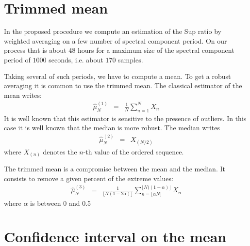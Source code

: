 
\section{Trimmed mean}
In the proposed procedure we compute an estimation of the Sup ratio by weighted averaging on a few number of spectral component period. On our process that is about $48$ hours for a maximum size of the spectral component period of $1000$ seconds, i.e. about $170$ samples. 

Taking several of such periods, we have to compute a mean. To get a robust averaging it is common to use the trimmed mean.
The classical estimator of the mean writes:
\begin{eqnarray*}
\hat \mu^{(1)}_{N} &=&\frac{1}{N}\sum_{n=1}^{N}X_{n}
\end{eqnarray*}
It is well known that this estimator is sensitive to the presence of outliers. In this case it is well known that the median is more robust. The median writes
\begin{eqnarray*}
\hat \mu^{(2)}_{N} &=&X_{(N/2)}
\end{eqnarray*}
where $X_{(n)}$ denotes the $n$-th value of the ordered sequence.

The trimmed mean is a compromise between the mean and the median. It consists to remove a given percent of the extreme values:
\begin{eqnarray*}
\hat \mu^{(3)}_{N} &=&\frac{1}{\lfloor N(1-2\alpha)\rfloor}\sum_{n=\lfloor \alpha N \rfloor }^{\lfloor N((1-\alpha)\rfloor }X_{n}
\end{eqnarray*}
where $\alpha$ is between $0$ and $0.5$

\section{Confidence interval on the mean}

